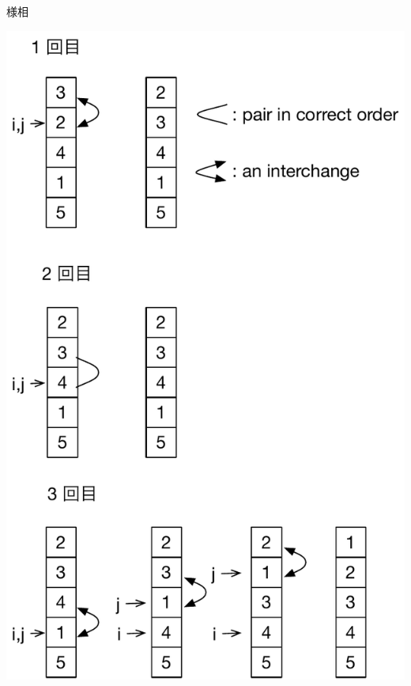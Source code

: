 \begin{frame}
\begin{columns}[t,onlytextwidth]
\begin{column}{0.55\linewidth}{様相}
\begin{center}
\includegraphics[scale=0.3]{./Figure/insertion_sort.pdf}
      \end{center}
    \end{column}
  \end{columns}
\end{frame}
